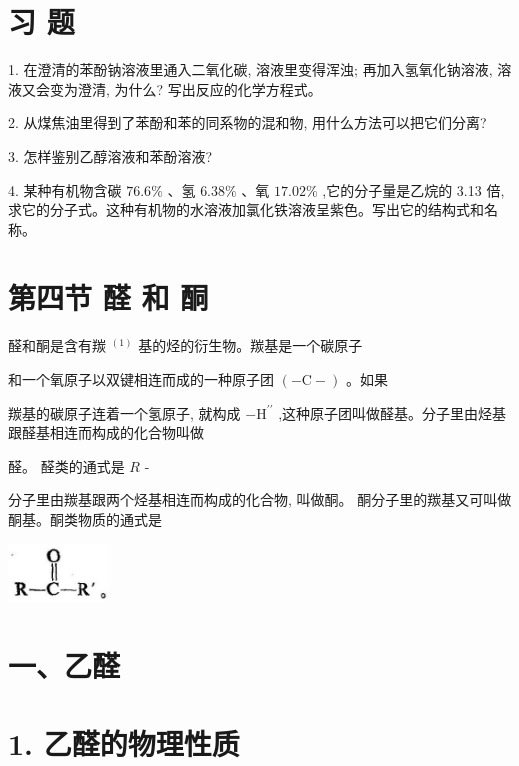 \documentclass[10pt]{article}
\newcommand{\customfootnote}[1]{
  \let\thefootnote\relax\footnotetext{#1}
}
\begin{document}
\section*{习 题}

1. 在澄清的苯酚钠溶液里通入二氧化碳, 溶液里变得浑浊; 再加入氢氧化钠溶液, 溶液又会变为澄清, 为什么? 写出反应的化学方程式。

2. 从煤焦油里得到了苯酚和苯的同系物的混和物, 用什么方法可以把它们分离?

3. 怎样鉴别乙醇溶液和苯酚溶液?

4. 某种有机物含碳 \({76.6}\%\) 、氢 \({6.38}\%\) 、氧 \({17.02}\%\) ,它的分子量是乙烷的 3.13 倍, 求它的分子式。这种有机物的水溶液加氯化铁溶液呈紫色。写出它的结构式和名称。

\section*{第四节 醛 和 酮}

醛和酮是含有羰 \({}^{\left( 1\right) }\) 基的烃的衍生物。羰基是一个碳原子

和一个氧原子以双键相连而成的一种原子团 \(\left( {-\mathrm{C} - }\right)\) 。如果

\customfootnote{

① 羰音 tāng,

}

羰基的碳原子连着一个氢原子, 就构成 \(- {\mathrm{H}}^{\prime \prime }\) ,这种原子团叫做醛基。分子里由烃基跟醛基相连而构成的化合物叫做

醛。 醛类的通式是 \(R\) -

分子里由羰基跟两个烃基相连而构成的化合物, 叫做酮。 酮分子里的羰基又可叫做酮基。酮类物质的通式是

\begin{center}
\includegraphics[max width=0.2\textwidth]{images/01912d16-be99-77bb-9535-4f3ed8d9946f_126_931653.jpg}
\end{center}

\section*{一、乙醛}

\section*{1. 乙醛的物理性质}
\end{document}
